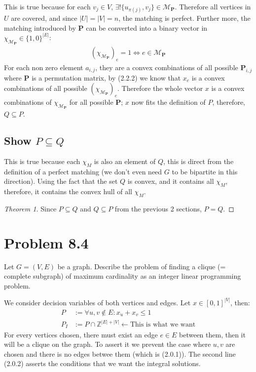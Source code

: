 \documentclass[]{article}
\theoremstyle{definition}
\begin{document}
        This is true because for each $v_j\in V$, $\exists! \{u_{\pi(j)}, v_j\} \in \mathcal M_{\mathbf P}$. Therefore all vertices in $U$ are covered, and since $|U|=|V|=n$, the matching is perfect. Further more, the matching introduced by $\mathbf P$ can be converted into a binary vector in $\chi_{\mathcal M_{\mathbf P}}\in \{1, 0\}^{|E|}$: 
        \begin{align}
            (\chi_{\mathcal M_{\mathbf P}})_e = 1 \iff e\in \mathcal M_{\mathbf P}
        \end{align}
        For each non zero element $a_{i, j}$, they are a convex combinations of all possible $\mathbf P_{i, j}$ where $\mathbf P$ is a permutation matrix, by (2.2.2) we know that $x_e$ is a convex combinations of all possible $(\chi_{\mathcal M_{\mathbf P}})_e$. Therefore the whole vector $x$ is a convex combinations of $\chi_{\mathcal M_{\mathbf P}}$ for all possible $\mathbf P$;  $x$ now fits the definition of $P$, therefore, $Q\subseteq P$. 
    \subsection{Show $P\subseteq Q$}
        This is true because each $\chi_{M}$ is also an element of $Q$, this is direct from the definition of a perfect matching (we don't even need $G$ to be bipartite in this direction). Using the fact that the set $Q$ is convex, and it contains all $\chi_{M}$, therefore, it contains the convex hull of all $\chi_{M}$.
    \begin{proof}[Theorem 1]
        Since $P\subseteq Q$ and $Q\subseteq P$ from the previous 2 sections, $P=Q$. 
    \end{proof} 
    
\section{Problem 8.4}
    Let $G = (V, E)$ be a graph. Describe the problem of finding a clique (= complete subgraph) of maximum cardinality as an integer linear programming problem. 
    \par
    We consider decision variables of both vertices and edges. Let $x\in [0, 1]^{|V|}$, then: 
    \begin{align}
        P & := \forall {u, v}\not \in E: 
                x_u + x_v \le 1
        \\
        P_I &:= P \cap \mathbb Z^{|E| + |V|} \leftarrow \text{This is what we want}
    \end{align}
    For every vertices chosen, there must exist an edge $e\in E$ between them, then it will be a clique on the graph. To assert it we prevent the case where $u, v$ are chosen and there is no edges betwee them (which is (2.0.1)). The second line (2.0.2) asserts the conditions that we want the integral solutions. 
\end{document}
